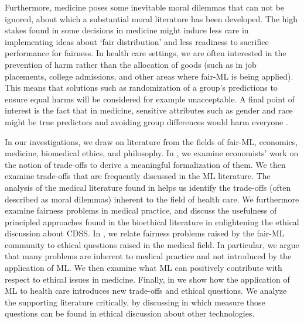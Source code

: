 Furthermore, medicine poses some inevitable moral dilemmas that can not be ignored, about which a substantial moral literature has been developed.
The high stakes found in some decisions in medicine might induce less care in implementing ideas about `fair distribution' and less readiness to sacrifice performance for fairness.
In health care settings, we are often interested in the prevention of harm rather than the allocation of goods (such as in job placements, college admissions, and other areas where fair-ML is being applied).
This means that solutions such as randomization of a group's predictions to ensure equal harms will be considered for example unacceptable.
A final point of interest is the fact that in medicine, sensitive attributes such as gender and race might be true predictors and avoiding group differences would harm everyone \cite{Mccradden2020}.

In our investigations, we draw on literature from the fields of fair-ML, economics, medicine, biomedical ethics, and philosophy.
In , we examine economists' work on the notion of trade-offs to derive a meaningful formalization of them.
We then examine trade-offs that are frequently discussed in the ML literature.
The analysis of the medical literature found in  helps us identify the trade-offs (often described as moral dilemmas) inherent to the field of health care.
We furthermore examine fairness problems in medical practice, and discuss the usefulness of principled approaches found in the bioethical literature in enlightening the ethical discussion about CDSS.
In , we relate fairness problems raised by the fair-ML community to ethical questions raised in the medical field.
In particular, we argue that many problems are inherent to medical practice and not introduced by the application of ML.
We then examine what ML can positively contribute with respect to ethical issues in medicine.
Finally, in  we show how the application of ML to health care introduces new trade-offs and ethical questions.
We analyze the supporting literature critically, by discussing in which measure those questions can be found in ethical discussion about other technologies.
